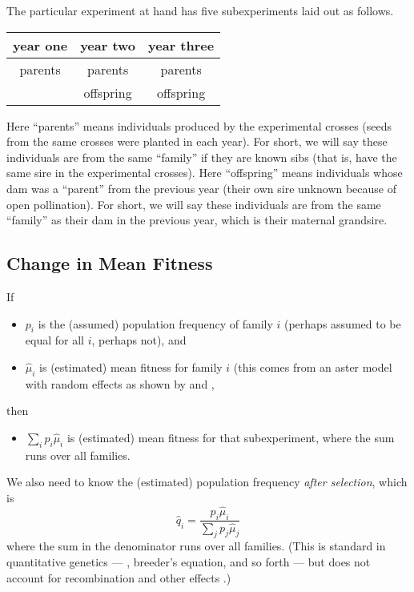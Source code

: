 \documentclass[11pt]{article}
\begin{document}
The particular experiment at hand has five subexperiments laid out as follows.
\begin{center}
\begin{tabular}{ccc}
\toprule
year one & year two & year three \\
\midrule
parents & parents & parents \\
        & offspring & offspring \\
\bottomrule
\end{tabular}
\end{center}
Here ``parents'' means individuals produced by the experimental crosses
(seeds from
the same crosses were planted in each year).  For short, we will say these
individuals are from the same ``family'' if they are known sibs
(that is, have the same sire in the experimental crosses).
Here ``offspring'' means individuals whose dam was a ``parent'' from the
previous year (their own sire unknown because of open pollination).
For short, we will say these
individuals are from the same ``family'' as their dam in the previous year,
which is their maternal grandsire.

\subsection{Change in Mean Fitness} \label{sec:change}

If
\begin{itemize}
\item $p_i$ is the (assumed) population frequency of family $i$
    (perhaps assumed to be equal for all $i$, perhaps not), and
\item $\hat{\mu}_i$ is (estimated) mean fitness for family $i$
    (this comes from an aster model with random effects as shown by
    \citet{kulbaba} and \citet{zenodo},
\end{itemize}
then
\begin{itemize}
\item $\sum_i p_i \hat{\mu}_i$ is (estimated) mean fitness for
that subexperiment, where the sum runs over all families.
\end{itemize}

We also need to know the (estimated) population frequency
\emph{after selection}, which is
\begin{equation*}
   \hat{q}_i = \frac{p_i \hat{\mu}_i}{\sum_j p_j \hat{\mu}_j}
\end{equation*}
where the sum in the denominator runs over all families.
(This is standard in quantitative genetics --- \citet{lande-arnold},
breeder's equation,
and so forth --- but does not account for recombination and other effects
\citep{pr70,pr72}.)
\end{document}
